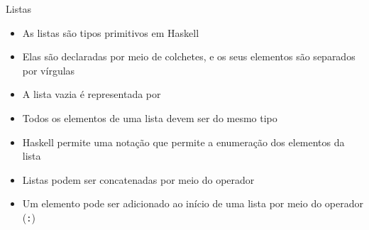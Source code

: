 \begin{frame}[fragile]{Listas}

    \begin{itemize}
        \item As listas são tipos primitivos em Haskell

        \item Elas são declaradas por meio de colchetes, e os seus elementos são separados
            por vírgulas 


        \item A lista vazia é representada por 

        \item Todos os elementos de uma lista devem ser do mesmo tipo

        \item Haskell permite uma notação que permite a enumeração dos elementos da lista


        \item Listas podem ser concatenadas por meio do operador 


        \item Um elemento pode ser adicionado ao início de uma lista por meio do operador
             (\texttt{:})

    \end{itemize}

\end{frame}

